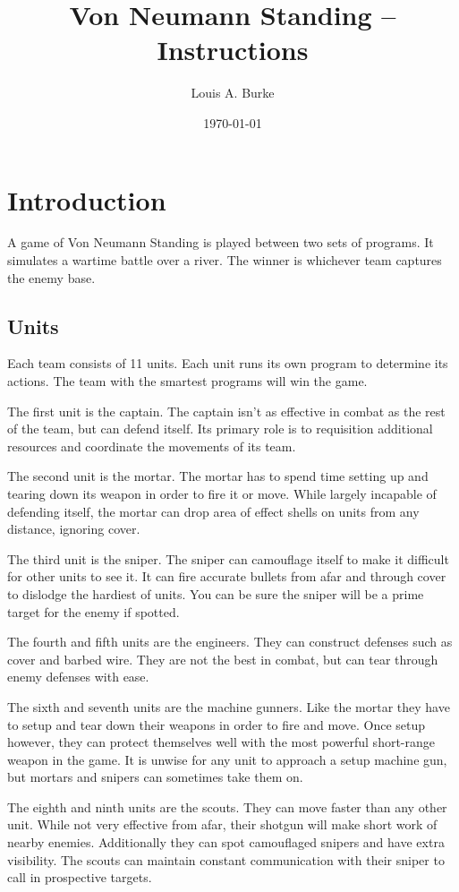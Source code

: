 \documentclass{article}
\title{Von Neumann Standing -- Instructions}
\date{\today}
\author{Louis A. Burke}
\begin{document}
\maketitle \clearpage

\section*{Introduction}

A game of Von Neumann Standing is played between two sets of programs. It
simulates a wartime battle over a river. The winner is whichever team captures
the enemy base.

\subsection*{Units}

Each team consists of 11 units. Each unit runs its own program to determine its
actions. The team with the smartest programs will win the game.

The first unit is the captain. The captain isn't as effective in combat as the
rest of the team, but can defend itself. Its primary role is to requisition
additional resources and coordinate the movements of its team.

The second unit is the mortar. The mortar has to spend time setting up and
tearing down its weapon in order to fire it or move. While largely incapable of
defending itself, the mortar can drop area of effect shells on units from any
distance, ignoring cover.

The third unit is the sniper. The sniper can camouflage itself to make it
difficult for other units to see it. It can fire accurate bullets from afar and
through cover to dislodge the hardiest of units. You can be sure the sniper will
be a prime target for the enemy if spotted.

The fourth and fifth units are the engineers. They can construct defenses such
as cover and barbed wire. They are not the best in combat, but can tear through
enemy defenses with ease.

The sixth and seventh units are the machine gunners. Like the mortar they have
to setup and tear down their weapons in order to fire and move. Once setup
however, they can protect themselves well with the most powerful short-range
weapon in the game. It is unwise for any unit to approach a setup machine gun,
but mortars and snipers can sometimes take them on.

The eighth and ninth units are the scouts. They can move faster than any other
unit. While not very effective from afar, their shotgun will make short work of
nearby enemies. Additionally they can spot camouflaged snipers and have extra
visibility. The scouts can maintain constant communication with their sniper to
call in prospective targets.
\end{document}
